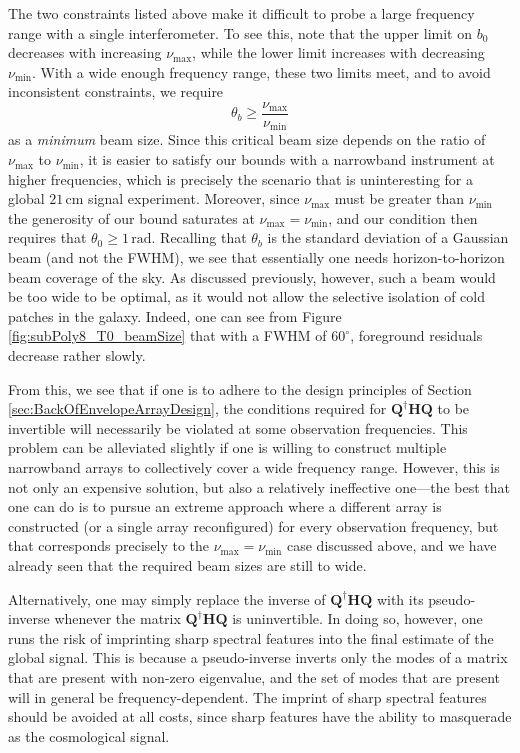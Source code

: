 \documentclass[twocolumn,apj,numberedappendix]{emulateapj}
\newcommand{\Hmat}{\mathbf{H}}
\newcommand{\Q}{\mathbf{Q}}
\newcommand{\acl}[1]{{\color{red} \textbf{[ACL:  #1]}}}
\newcommand{\mep}[1]{{\color{applegreen} \textbf{[MEP:  #1]}}}
\begin{document}
The two constraints listed above make it difficult to probe a large frequency range with a single interferometer.  To see this, note that the upper limit on $b_0$ decreases with increasing $\nu_\textrm{max}$, while the lower limit increases with decreasing $\nu_\textrm{min}$.  With a wide enough frequency range, these two limits meet, and to avoid inconsistent constraints, we require
\begin{equation}
\theta_b \ge \frac{\nu_\textrm{max} }{\nu_\textrm{min}}
\end{equation}
as a \emph{minimum} beam size.  Since this critical beam size depends on the ratio of $\nu_\textrm{max}$ to $\nu_\textrm{min}$, it is easier to satisfy our bounds with a narrowband instrument at higher frequencies, which is precisely the scenario that is uninteresting for a global $21\,\textrm{cm}$ signal experiment. Moreover, since $\nu_\textrm{max}$ must be greater than $\nu_\textrm{min}$ the generosity of our bound saturates at $\nu_\textrm{max} = \nu_\textrm{min}$, and our condition then requires that $\theta_0 \ge 1\,\textrm{rad}$. Recalling that $\theta_b$ is the standard deviation of a Gaussian beam (and not the FWHM), we see that essentially one needs horizon-to-horizon beam coverage of the sky. As discussed previously, however, such a beam would be too wide to be optimal, as it would not allow the selective isolation of cold patches in the galaxy. Indeed, one can see from Figure \ref{fig:subPoly8_T0_beamSize} that with a FWHM of $60^\circ$, foreground residuals decrease rather slowly.
%

From this, we see that if one is to adhere to the design principles of Section \ref{sec:BackOfEnvelopeArrayDesign}, the conditions required for $\Q^\dagger \Hmat \Q$ to be invertible will necessarily be violated at some observation frequencies. This problem can be alleviated slightly if one is willing to construct multiple narrowband arrays to collectively cover a wide frequency range. However, this is not only an expensive solution, but also a relatively ineffective one---the best that one can do is to pursue an extreme approach where a different array is constructed (or a single array reconfigured) for every observation frequency, but that corresponds precisely to the $\nu_\textrm{max} = \nu_\textrm{min}$ case discussed above, and we have already seen that the required beam sizes are still to wide.

Alternatively, one may simply replace the inverse of $\Q^\dagger \Hmat \Q$ with its pseudo-inverse whenever the matrix $\Q^\dagger \Hmat \Q$ is uninvertible. In doing so, however, one runs the risk of imprinting sharp spectral features into the final estimate of the global signal. This is because a pseudo-inverse inverts only the modes of a matrix that are present with non-zero eigenvalue, and the set of modes that are present will in general be frequency-dependent. The imprint of sharp spectral features should be avoided at all costs, since sharp features have the ability to masquerade as the cosmological signal.
\end{document}
